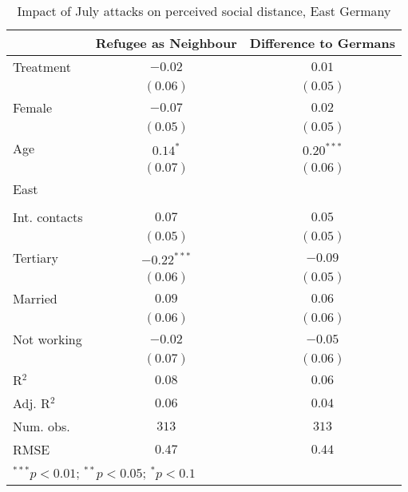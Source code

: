 
\begin{table}
\caption{Impact of July attacks on perceived social distance, East Germany}
\begin{center}
\begin{tabular}{l c c}
\toprule
 & Refugee as Neighbour & Difference to Germans \\
\midrule
Treatment     & $-0.02$       & $0.01$       \\
              & $(0.06)$      & $(0.05)$     \\
Female        & $-0.07$       & $0.02$       \\
              & $(0.05)$      & $(0.05)$     \\
Age           & $0.14^{*}$    & $0.20^{***}$ \\
              & $(0.07)$      & $(0.06)$     \\
East          &               &              \\
              &               &              \\
Int. contacts & $0.07$        & $0.05$       \\
              & $(0.05)$      & $(0.05)$     \\
Tertiary      & $-0.22^{***}$ & $-0.09$      \\
              & $(0.06)$      & $(0.05)$     \\
Married       & $0.09$        & $0.06$       \\
              & $(0.06)$      & $(0.06)$     \\
Not working   & $-0.02$       & $-0.05$      \\
              & $(0.07)$      & $(0.06)$     \\
\midrule
R$^2$         & $0.08$        & $0.06$       \\
Adj. R$^2$    & $0.06$        & $0.04$       \\
Num. obs.     & $313$         & $313$        \\
RMSE          & $0.47$        & $0.44$       \\
\bottomrule
\multicolumn{3}{l}{\scriptsize{$^{***}p<0.01$; $^{**}p<0.05$; $^{*}p<0.1$}}
\end{tabular}
\label{tab_dist_east}
\end{center}
\end{table}
